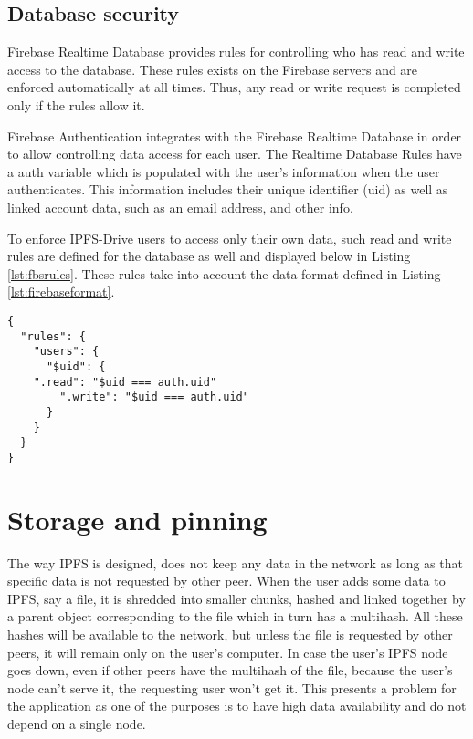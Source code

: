 \documentclass[12pt]{report}
\begin{document}
\subsection{Database security}

Firebase Realtime Database provides rules for controlling who has read and write access to the database. These rules exists on the Firebase servers and are enforced automatically at all times. Thus, any read or write request is completed only if the rules allow it. 

Firebase Authentication integrates with the Firebase Realtime Database in order to allow controlling data access for each user. The Realtime Database Rules have a {\ttfamily auth} variable which is populated with the user's information when the user authenticates. This information includes their unique identifier (uid) as well as linked account data, such as an email address, and other info. 

To enforce IPFS-Drive users to access only their own data, such read and write rules are defined for the database as well and displayed below in Listing \ref{lst:fbsrules}. These rules take into account the data format defined in Listing \ref{lst:firebaseformat}.

\begin{lstlisting}
{
  "rules": {
    "users": {
      "$uid": {
	".read": "$uid === auth.uid"
        ".write": "$uid === auth.uid"
      }
    }
  }
}
\end{lstlisting}

\section{Storage and pinning}

The way IPFS is designed, does not keep any data in the network as long as that specific data is not requested by other peer. When the user adds some data to IPFS, say a file, it is shredded into smaller chunks, hashed and linked together by a parent object corresponding to the file which in turn has a multihash. All these hashes will be available to the network, but unless the file is requested by other peers, it will remain only on the user's computer. In case the user's IPFS node goes down, even if other peers have the multihash of the file, because the user's node can't serve it, the requesting user won't get it. This presents a problem for the application as one of the purposes is to have high data availability and do not depend on a single node. 
\end{document}
